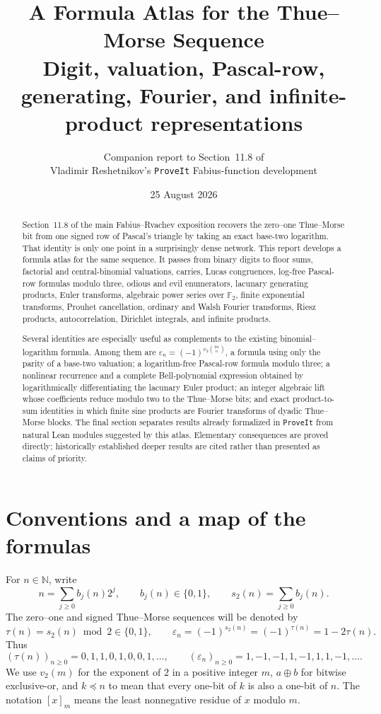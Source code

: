 \documentclass[11pt,oneside]{article}
\title{\bfseries A Formula Atlas for the Thue--Morse Sequence\\[0.35em]
\large Digit, valuation, Pascal-row, generating, Fourier, and infinite-product representations}
\author{Companion report to Section~11.8 of\\
\small Vladimir Reshetnikov's \texttt{ProveIt} Fabius-function development}
\date{25 August 2026}
\theoremstyle{definition}
\theoremstyle{remark}
\newcommand{\N}{\mathbb N}
\newcommand{\vtwo}{v_2}
\newcommand{\bitsum}{s_2}
\newcommand{\eps}{\varepsilon}
\newcommand{\res}[2]{\left[#1\right]_{#2}}
\newcommand{\xor}{\mathbin{\oplus}}
\newcommand{\submask}{\preccurlyeq}
\begin{document}
\maketitle

\begin{abstract}
Section~11.8 of the main Fabius--Rvachev exposition recovers the zero--one
Thue--Morse bit from one signed row of Pascal's triangle by taking an exact
base-two logarithm.  That identity is only one point in a surprisingly dense
network.  This report develops a formula atlas for the same sequence.  It
passes from binary digits to floor sums, factorial and central-binomial
valuations, carries, Lucas congruences, log-free Pascal-row formulas modulo
three, odious and evil enumerators, lacunary generating products, Euler
transforms, algebraic power series over \(\mathbb F_2\), finite exponential
transforms, Prouhet cancellation, ordinary and Walsh Fourier transforms,
Riesz products, autocorrelation, Dirichlet integrals, and infinite products.

Several identities are especially useful as complements to the existing
binomial--logarithm formula.  Among them are
\(\eps_n=(-1)^{v_2\binom{2n}{n}}\), a formula using only the parity of a
base-two valuation; a logarithm-free Pascal-row formula modulo three; a
nonlinear recurrence and a complete Bell-polynomial expression obtained by
logarithmically differentiating the lacunary Euler product; an integer
algebraic lift whose coefficients reduce modulo two to the Thue--Morse bits;
and exact product-to-sum identities in which finite sine products are Fourier
transforms of dyadic Thue--Morse blocks.  The final section separates results
already formalized in \texttt{ProveIt} from natural Lean modules suggested by
this atlas.  Elementary consequences are proved directly; historically
established deeper results are cited rather than presented as claims of
priority.
\end{abstract}

\tableofcontents
\newpage

\section{Conventions and a map of the formulas}
\label{sec:conventions}

For \(n\in\N\), write
\[
  n=\sum_{j\ge 0} b_j(n)2^j,
  \qquad b_j(n)\in\{0,1\},
  \qquad \bitsum(n)=\sum_{j\ge0}b_j(n).
\]
The zero--one and signed Thue--Morse sequences will be denoted by
\begin{equation}
  \tau(n)=\bitsum(n)\bmod 2\in\{0,1\},
  \qquad
  \eps_n=(-1)^{\bitsum(n)}=(-1)^{\tau(n)}=1-2\tau(n).
  \label{eq:basic-definitions}
\end{equation}
Thus
\[
  (\tau(n))_{n\ge0}=0,1,1,0,1,0,0,1,\ldots,
  \qquad
  (\eps_n)_{n\ge0}=1,-1,-1,1,-1,1,1,-1,\ldots .
\]
We use \(\vtwo(m)\) for the exponent of \(2\) in a positive integer \(m\),
\(a\xor b\) for bitwise exclusive-or, and \(k\submask n\) to mean that every
one-bit of \(k\) is also a one-bit of \(n\).  The notation \(\res{x}{m}\)
means the least nonnegative residue of \(x\) modulo \(m\).
\end{document}
